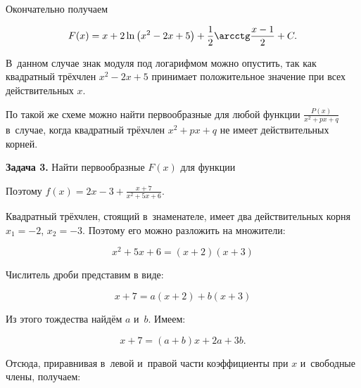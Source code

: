 Окончательно получаем

\begin{equation*}
\displaystyle F(x) =
x + 2 \ln \left( x^{2} - 2x + 5 \right) + \frac{1}{2} \arcctg \frac{x - 1}{2} + C.
\end{equation*}

В~данном случае знак модуля под логарифмом можно опустить, так как квадратный трёхчлен
$x^{2} - 2x + 5$ принимает положительное значение при всех действительных $x$.

По такой же схеме можно найти первообразные для любой функции
$\displaystyle \frac{P(x)}{x^{2} + px + q}$ в~случае, когда квадратный трёхчлен
$x^{2} + px + q$ не имеет действительных корней.

\textbf{Задача 3.}\label{ex:5_8_3} Найти первообразные $F(x)$ для функции

%
%

\noindent
Поэтому $\displaystyle f(x) = 2x -3 + \frac{x + 7}{x^{2} + 5x + 6}$.

Квадратный трёхчлен, стоящий в~знаменателе, имеет два действительных корня
$x_{1} = -2$, $x_{2} = -3$. Поэтому его можно разложить на множители:

\begin{equation*}
x^{2} + 5x + 6 = (x + 2)(x + 3)
\end{equation*}

\noindent
Числитель дроби представим в виде:

\begin{equation}\label{eq:5_8_1}
x + 7 = a(x + 2) + b(x + 3)
\end{equation}

\noindent
Из этого тождества найдём $a$ и~$b$. Имеем:

\begin{equation*}
x + 7 = (a + b)x + 2a + 3b.
\end{equation*}

Отсюда, приравнивая в~левой и~правой части коэффициенты при $x$ и~свободные члены,
получаем:

